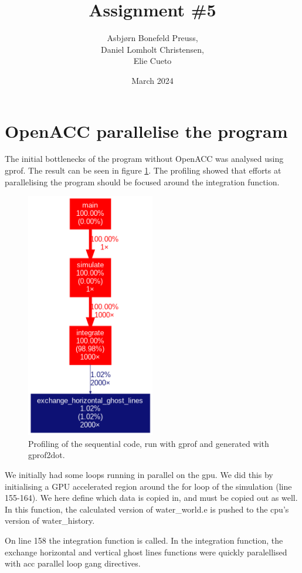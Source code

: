 \documentclass{article}
\title{Assignment \#5}
\author{Asbjørn Bonefeld Preuss,\\ Daniel Lomholt Christensen,\\ Elie Cueto}
\date{March 2024}
\begin{document}
\maketitle
\section{OpenACC parallelise the program}
The initial bottlenecks of the program without OpenACC was analysed using gprof. The result can be seen in figure \ref{fig:profiling:seq}. The profiling showed that efforts at parallelising the program should be focused around the integration function.
\begin{figure}[h]
    \includegraphics[width=0.5\textwidth]{./figures/sequential_profile.png}
    \centering
    \caption{Profiling of the sequential code, run with gprof and generated with gprof2dot.}
    \label{fig:profiling:seq}
\end{figure}
We initially had some loops running in parallel on the gpu. 
We did this by initialising a GPU accelerated region around the for loop of the simulation (line 155-164).
We here define which data is copied in, and must be copied out as well. In this function, the calculated version of water\_world.e is pushed to the cpu's version of water\_history.

On line 158 the integration function is called. In the integration function, the exchange horizontal and vertical ghost lines functions were quickly paralellised with acc parallel loop gang directives.
\end{document}
